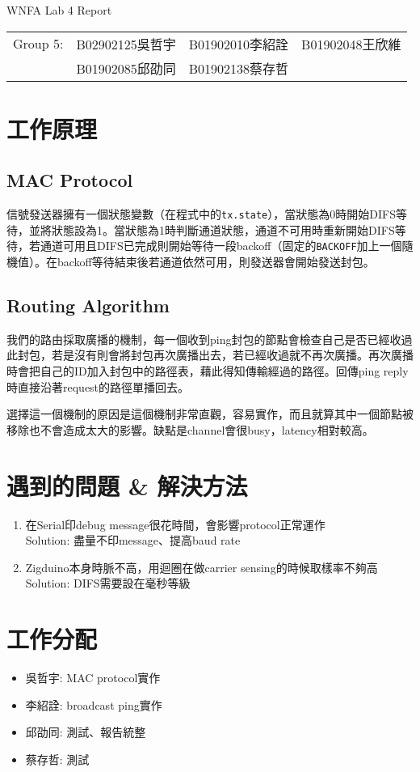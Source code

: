 \documentclass[10pt,a4paper]{article}
\begin{document}
\thispagestyle{fancy}

\begin{center}
    \LARGE WNFA Lab 4 Report
\end{center}
\begin{center}\begin{tabular}{lccr}
    Group 5: & B02902125吳哲宇 & B01902010李紹詮 & B01902048王欣維 \\
    & B01902085邱劭同 & B01902138蔡存哲
\end{tabular}\end{center}

\section*{工作原理}
\subsection*{MAC Protocol}
信號發送器擁有一個狀態變數（在程式中的\texttt{tx.state}），當狀態為0時開始DIFS等待，並將狀態設為1。當狀態為1時判斷通道狀態，通道不可用時重新開始DIFS等待，若通道可用且DIFS已完成則開始等待一段backoff（固定的\texttt{BACKOFF}加上一個隨機值）。在backoff等待結束後若通道依然可用，則發送器會開始發送封包。

\subsection*{Routing Algorithm}
我們的路由採取廣播的機制，每一個收到ping封包的節點會檢查自己是否已經收過此封包，若是沒有則會將封包再次廣播出去，若已經收過就不再次廣播。再次廣播時會把自己的ID加入封包中的路徑表，藉此得知傳輸經過的路徑。回傳ping reply時直接沿著request的路徑單播回去。

選擇這一個機制的原因是這個機制非常直觀，容易實作，而且就算其中一個節點被移除也不會造成太大的影響。缺點是channel會很busy，latency相對較高。

\section*{遇到的問題 \& 解決方法}
\begin{enumerate}
    \item 在Serial印debug message很花時間，會影響protocol正常運作\\
    Solution: 盡量不印message、提高baud rate
    \item Zigduino本身時脈不高，用迴圈在做carrier sensing的時候取樣率不夠高\\
    Solution: DIFS需要設在毫秒等級
\end{enumerate}

\section*{工作分配}
\begin{itemize}[leftmargin=!,itemindent=-4em]
    \item 吳哲宇: MAC protocol實作
    \item 李紹詮: broadcast ping實作
    \item 邱劭同: 測試、報告統整
    \item 蔡存哲: 測試
\end{itemize}
\end{document}
